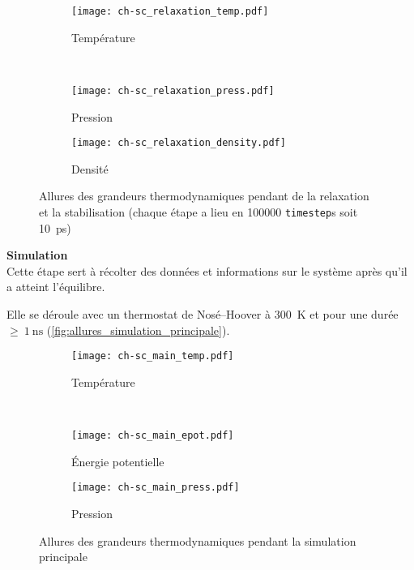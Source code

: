 \begin{figure}[h]
    \centering
    \begin{subfigure}[t]{.49\textwidth}
        \texttt{[image: ch-sc\_relaxation\_temp.pdf]}
        \caption{Température}
    \end{subfigure}%
    ~
    \begin{subfigure}[t]{.49\textwidth}
        \texttt{[image: ch-sc\_relaxation\_press.pdf]}
        \caption{Pression}
    \end{subfigure}
    \begin{subfigure}[t]{.49\textwidth}
        \texttt{[image: ch-sc\_relaxation\_density.pdf]}
        \caption{Densité}
    \end{subfigure}
    \caption{Allures des grandeurs thermodynamiques pendant de la relaxation et la stabilisation {\tiny (chaque étape a lieu en \num{100000} \lstinline!timestep!s soit \qty{10}{\pico \second})}}
    \label{fig:allures_thermostat_barostat}
\end{figure}

\textbf{Simulation}\\
Cette étape sert à récolter des données et informations sur le système après qu'il a atteint l'équilibre.

Elle se déroule avec un thermostat de Nosé--Hoover à \qty{300}{\kelvin} et pour une durée $\geq~\qty{1}{\nano \second}$ (\autoref{fig:allures_simulation_principale}).

\begin{figure}[h]
    \centering
    \begin{subfigure}[t]{.49\textwidth}
        \texttt{[image: ch-sc\_main\_temp.pdf]}
        \caption{Température}
    \end{subfigure}%
    ~
    \begin{subfigure}[t]{.49\textwidth}
        \texttt{[image: ch-sc\_main\_epot.pdf]}
        \caption{Énergie potentielle}
    \end{subfigure}
    \begin{subfigure}[t]{.49\textwidth}
        \texttt{[image: ch-sc\_main\_press.pdf]}
        \caption{Pression}
    \end{subfigure}
    \caption{Allures des grandeurs thermodynamiques pendant la simulation principale}
    \label{fig:allures_simulation_principale}
\end{figure}
